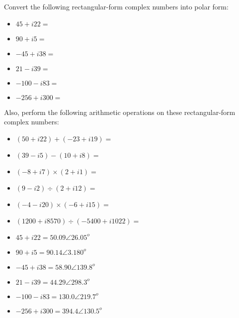 

Convert the following rectangular-form complex numbers into polar form:

\begin{itemize}
\item{} $45 + i22 = $ 
\vskip 5pt
\item{} $90 + i5 = $ 
\vskip 5pt
\item{} $-45 + i38 = $ 
\vskip 5pt
\item{} $21 - i39 = $ 
\vskip 5pt
\item{} $-100 - i83 = $ 
\vskip 5pt
\item{} $-256 + i300 = $ 
\end{itemize}

\vskip 10pt

Also, perform the following arithmetic operations on these rectangular-form complex numbers:

\begin{itemize}
\item{} $(50 + i22) + (-23 + i19) = $ 
\vskip 5pt
\item{} $(39 - i5) - (10 + i8) = $ 
\vskip 5pt
\item{} $(-8 + i7) \times (2 + i1) = $ 
\vskip 5pt
\item{} $(9 - i2) \div (2 + i12) = $ 
\vskip 5pt
\item{} $(-4 - i20) \times (-6 + i15) = $ 
\vskip 5pt
\item{} $(1200 + i8570) \div (-5400 + i1022) = $ 
\end{itemize}







\begin{itemize}
\item{} $45 + i22 = 50.09 \angle 26.05^o$ 
\vskip 5pt
\item{} $90 + i5 = 90.14 \angle 3.180^o $ 
\vskip 5pt
\item{} $-45 + i38 = 58.90 \angle 139.8^o $ 
\vskip 5pt
\item{} $21 - i39 = 44.29 \angle 298.3^o $ 
\vskip 5pt
\item{} $-100 - i83 = 130.0 \angle 219.7^o $ 
\vskip 5pt
\item{} $-256 + i300 = 394.4 \angle 130.5^o $ 
\end{itemize}

